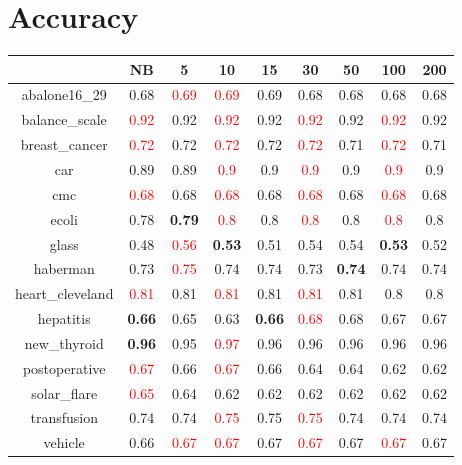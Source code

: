 \documentclass{article}%
\begin{document}
%
\normalsize%
\section*{Accuracy}%
\begin{tabular}{c|cccccccc}%
\hline%
&NB&5&10&15&30&50&100&200\\%
\hline%
abalone16\_29&0.68&\textcolor{red}{ 
0.69
}&\textcolor{red}{ 
0.69
}&0.69&0.68&0.68&0.68&0.68\\%
\hline%
balance\_scale&\textcolor{red}{ 
0.92
}&0.92&\textcolor{red}{ 
0.92
}&0.92&\textcolor{red}{ 
0.92
}&0.92&\textcolor{red}{ 
0.92
}&0.92\\%
\hline%
breast\_cancer&\textcolor{red}{ 
0.72
}&0.72&\textcolor{red}{ 
0.72
}&0.72&\textcolor{red}{ 
0.72
}&0.71&\textcolor{red}{ 
0.72
}&0.71\\%
\hline%
car&0.89&0.89&\textcolor{red}{ 
0.9
}&0.9&\textcolor{red}{ 
0.9
}&0.9&\textcolor{red}{ 
0.9
}&0.9\\%
\hline%
cmc&\textcolor{red}{ 
0.68
}&0.68&\textcolor{red}{ 
0.68
}&0.68&\textcolor{red}{ 
0.68
}&0.68&\textcolor{red}{ 
0.68
}&0.68\\%
\hline%
ecoli&0.78&\textbf{0.79}&\textcolor{red}{ 
0.8
}&0.8&\textcolor{red}{ 
0.8
}&0.8&\textcolor{red}{ 
0.8
}&0.8\\%
\hline%
glass&0.48&\textcolor{red}{ 
0.56
}&\textbf{0.53}&0.51&0.54&0.54&\textbf{0.53}&0.52\\%
\hline%
haberman&0.73&\textcolor{red}{ 
0.75
}&0.74&0.74&0.73&\textbf{0.74}&0.74&0.74\\%
\hline%
heart\_cleveland&\textcolor{red}{ 
0.81
}&0.81&\textcolor{red}{ 
0.81
}&0.81&\textcolor{red}{ 
0.81
}&0.81&0.8&0.8\\%
\hline%
hepatitis&\textbf{0.66}&0.65&0.63&\textbf{0.66}&\textcolor{red}{ 
0.68
}&0.68&0.67&0.67\\%
\hline%
new\_thyroid&\textbf{0.96}&0.95&\textcolor{red}{ 
0.97
}&0.96&0.96&0.96&0.96&0.96\\%
\hline%
postoperative&\textcolor{red}{ 
0.67
}&0.66&\textcolor{red}{ 
0.67
}&0.66&0.64&0.64&0.62&0.62\\%
\hline%
solar\_flare&\textcolor{red}{ 
0.65
}&0.64&0.62&0.62&0.62&0.62&0.62&0.62\\%
\hline%
transfusion&0.74&0.74&\textcolor{red}{ 
0.75
}&0.75&\textcolor{red}{ 
0.75
}&0.74&0.74&0.74\\%
\hline%
vehicle&0.66&\textcolor{red}{ 
0.67
}&\textcolor{red}{ 
0.67
}&0.67&\textcolor{red}{ 
0.67
}&0.67&\textcolor{red}{ 
0.67
}&0.67\\%

\end{tabular}
\end{document}
